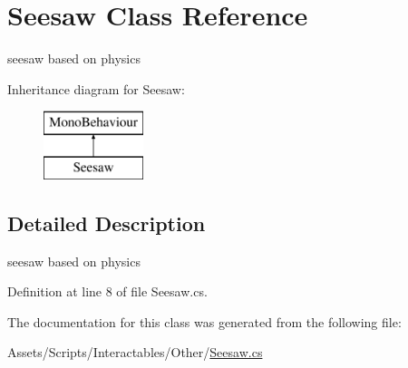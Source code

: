 \hypertarget{class_seesaw}{}\section{Seesaw Class Reference}
\label{class_seesaw}


seesaw based on physics  


Inheritance diagram for Seesaw\+:\begin{figure}[H]
\begin{center}
\leavevmode
\includegraphics[height=2.000000cm]{class_seesaw}
\end{center}
\end{figure}


\subsection{Detailed Description}
seesaw based on physics 



Definition at line 8 of file Seesaw.\+cs.



The documentation for this class was generated from the following file\+:\begin{DoxyCompactItemize}
\item 
Assets/\+Scripts/\+Interactables/\+Other/\mbox{\hyperlink{_seesaw_8cs}{Seesaw.\+cs}}\end{DoxyCompactItemize}
